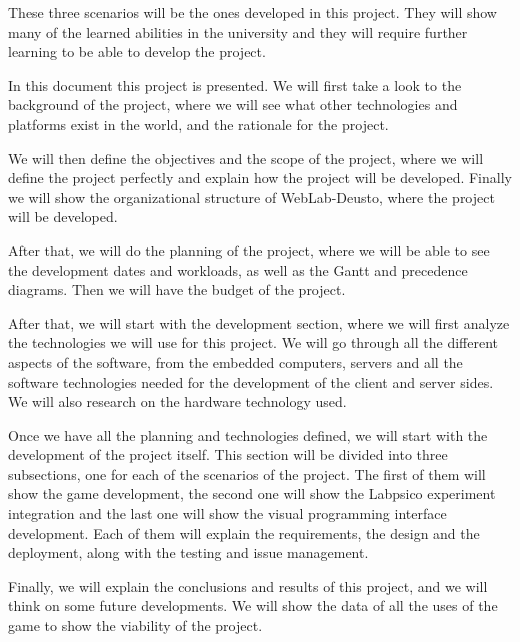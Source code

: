 These three scenarios will be the ones developed in this project. They will show many of the learned
abilities in the university and they will require further learning to be able to develop the
project.

In this document this project is presented. We will first take a look to the background of the
project, where we will see what other technologies and platforms exist in the world, and the
rationale for the project.

We will then define the objectives and the scope of the project, where we will define the project
perfectly and explain how the project will be developed. Finally we will show the organizational
structure of WebLab-Deusto, where the project will be developed.

After that, we will do the planning of the project, where we will be able to see the development
dates and workloads, as well as the Gantt and precedence diagrams. Then we will have the budget of
the project.

After that, we will start with the development section, where we will first analyze the technologies
we will use for this project. We will go through all the different aspects of the software, from the
embedded computers, servers and all the software technologies needed for the development of the
client and server sides. We will also research on the hardware technology used.

Once we have all the planning and technologies defined, we will start with the development of the
project itself. This section will be divided into three subsections, one for each of the scenarios
of the project. The first of them will show the game development, the second one will show the
Labpsico experiment integration and the last one will show the visual programming interface
development. Each of them will explain the requirements, the design and the deployment, along with
the testing and issue management.

Finally, we will explain the conclusions and results of this project, and we will think on some
future developments. We will show the data of all the uses of the game to show the viability of the
project.
